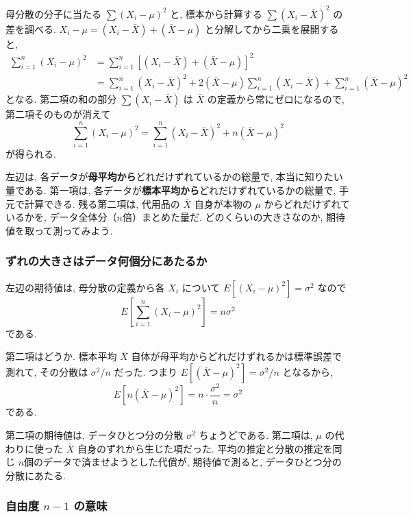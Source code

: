     母分散の分子に当たる $\sum(X_i - \mu)^2$ と, 標本から計算する $\sum(X_i - \bar{X})^2$ の差を調べる.
    $X_i - \mu = (X_i - \bar{X}) + (\bar{X} - \mu)$ と分解してから二乗を展開すると,
    \begin{align*}
      \sum_{i=1}^n (X_i - \mu)^2
      &= \sum_{i=1}^n \left[ (X_i - \bar{X}) + (\bar{X} - \mu) \right]^2 \\
      &= \sum_{i=1}^n (X_i - \bar{X})^2 + 2(\bar{X} - \mu) \sum_{i=1}^n (X_i - \bar{X}) + \sum_{i=1}^n (\bar{X} - \mu)^2
    \end{align*}
    となる.
    第二項の和の部分 $\sum (X_i - \bar{X})$ は $\bar{X}$ の定義から常にゼロになるので, 第二項そのものが消えて
    \[
      \sum_{i=1}^n (X_i - \mu)^2 = \sum_{i=1}^n (X_i - \bar{X})^2 + n(\bar{X} - \mu)^2
    \]
    が得られる.

    左辺は, 各データが\textbf{母平均から}どれだけずれているかの総量で, 本当に知りたい量である.
    第一項は, 各データが\textbf{標本平均から}どれだけずれているかの総量で, 手元で計算できる.
    残る第二項は, 代用品の $\bar{X}$ 自身が本物の $\mu$ からどれだけずれているかを, データ全体分（$n$倍）まとめた量だ.
    どのくらいの大きさなのか, 期待値を取って測ってみよう.

    \subsubsection*{ずれの大きさはデータ何個分にあたるか}

    左辺の期待値は, 母分散の定義から各 $X_i$ について $E[(X_i - \mu)^2] = \sigma^2$ なので
    \[
      E\!\left[\sum_{i=1}^n (X_i - \mu)^2\right] = n\sigma^2
    \]
    である.

    第二項はどうか.
    標本平均 $\bar{X}$ 自体が母平均からどれだけずれるかは標準誤差で測れて, その分散は $\sigma^2/n$ だった.
    つまり $E[(\bar{X} - \mu)^2] = \sigma^2/n$ となるから,
    \[
      E[n(\bar{X} - \mu)^2] = n \cdot \frac{\sigma^2}{n} = \sigma^2
    \]
    である.

    第二項の期待値は, データひとつ分の分散 $\sigma^2$ ちょうどである.
    第二項は, $\mu$ の代わりに使った $\bar{X}$ 自身のずれから生じた項だった.
    平均の推定と分散の推定を同じ $n$個のデータで済ませようとした代償が, 期待値で測ると, データひとつ分の分散にあたる.

    \subsubsection*{自由度 \texorpdfstring{$n-1$}{n-1} の意味}

